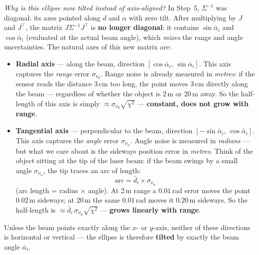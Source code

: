 \documentclass[12pt, a4paper]{article}
\begin{document}
\textit{Why is this ellipse now tilted instead of axis-aligned?}
In Step~5, $\Sigma^{-1}$ was diagonal: its axes pointed along $d$ and
$\alpha$ with zero tilt.
After multiplying by $J$ and $J^\top$, the matrix $J\Sigma^{-1}J^\top$
is \textbf{no longer diagonal}: it contains $\sin\bar{\alpha}_i$ and
$\cos\bar{\alpha}_i$ (evaluated at the actual beam angle), which
\emph{mixes} the range and angle uncertainties.
The natural axes of this new matrix are:
\begin{itemize}[leftmargin=1.2em,itemsep=6pt]
  \item \textbf{Radial axis} --- along the beam, direction
    $[\cos\bar{\alpha}_i,\,\sin\bar{\alpha}_i]$.
    This axis captures the \emph{range} error $\sigma_{\nu_d}$.
    Range noise is already measured in \emph{metres}: if the sensor
    reads the distance 3\,cm too long, the point moves 3\,cm directly
    along the beam --- regardless of whether the object is 2\,m or
    20\,m away.
    So the half-length of this axis is simply $\approx\sigma_{\nu_d}\sqrt{\chi^2}$
    --- \textbf{constant, does not grow with range}.

  \item \textbf{Tangential axis} --- perpendicular to the beam, direction
    $[-\sin\bar{\alpha}_i,\,\cos\bar{\alpha}_i]$.
    This axis captures the \emph{angle} error $\sigma_{\nu_\alpha}$.
    Angle noise is measured in \emph{radians} --- but what we care about
    is the sideways position error in \emph{metres}.
    Think of the object sitting at the tip of the laser beam: if the
    beam swings by a small angle $\sigma_{\nu_\alpha}$, the tip traces
    an arc of length:
    \[
      \text{arc} = \bar{d}_i \times \sigma_{\nu_\alpha}
    \]
    (arc length = radius $\times$ angle).
    At 2\,m range a $0.01$\,rad error moves the point $0.02$\,m
    sideways; at 20\,m the same $0.01$\,rad moves it $0.20$\,m
    sideways.
    So the half-length is $\approx\bar{d}_i\,\sigma_{\nu_\alpha}\sqrt{\chi^2}$
    --- \textbf{grows linearly with range}.
\end{itemize}
Unless the beam points exactly along the $x$- or $y$-axis, neither of
these directions is horizontal or vertical --- the ellipse is therefore
\textbf{tilted} by exactly the beam angle $\bar{\alpha}_i$.
\end{document}
